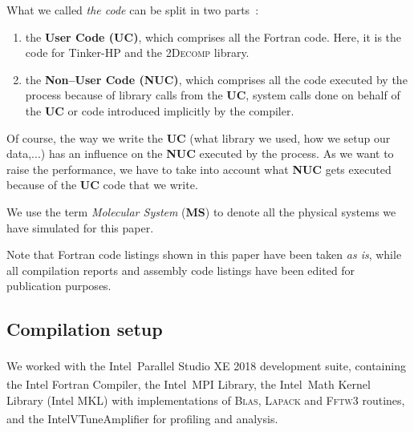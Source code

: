 \documentclass[9pt,comparison]{livecoms}
\newcommand{\rr}{\textsuperscript{\textregistered}}
\newcommand{\tm}{\textsuperscript{\texttrademark}}
\begin{document}
What we called \emph{the code} can be split in two parts~:
\begin{enumerate}
\item the \textbf{User Code (UC)}, which comprises all the Fortran code. Here, it is the code for Tinker-HP and the \textsc{2Decomp} library.
\item the \textbf{Non--User Code (NUC)}, which comprises all the code executed by the process because of library calls from the \textbf{UC}, system calls done on behalf of the \textbf{UC} or code introduced implicitly by the compiler.
\end{enumerate}

Of course, the way we write the \textbf{UC} (what library we used, how we setup our data,...) has an influence on the \textbf{NUC} executed by the process. As we want to raise the performance, we have to take into account what \textbf{NUC} gets executed because of the \textbf{UC} code that we write.

We use the term \emph{Molecular System} (\textbf{MS}) to denote all the physical systems we have simulated for this paper.

Note that Fortran code listings shown in this paper have been taken \emph{as is}, while all compilation reports and assembly code listings have been edited for publication purposes.
\subsection{Compilation setup}
\hspace{\parindent} We worked with the Intel\rr\ Parallel Studio XE 2018 development suite\cite{intel-parallel-studio}, containing the Intel Fortran Compiler, the Intel\rr\ MPI Library, the Intel\rr\ Math Kernel Library (Intel MKL) with implementations of \textsc{Blas}\cite{blas}, \textsc{Lapack}\cite{lapack} and \textsc{Fftw3}\cite{fftw3} routines, and the Intel\rr VTune\tm  Amplifier for profiling and analysis.
\end{document}
